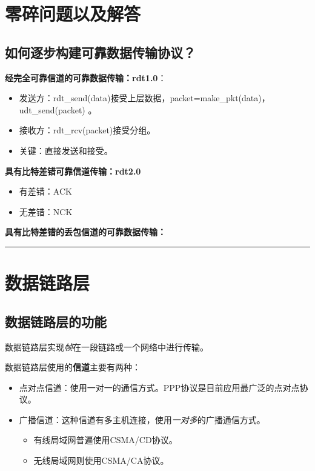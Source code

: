 \documentclass[b5paper, twoside]{article}
\let\oldtextbf\textbf
\renewcommand{\textbf}[1]{\textcolor{myblue}{\oldtextbf{#1}}}
\let\oldemph\emph
\renewcommand{\emph}[1]{{\oldemph{#1}}}
\begin{document}
\newpage

\section{零碎问题以及解答}

\subsection{如何逐步构建可靠数据传输协议？}

\textbf{经完全可靠信道的可靠数据传输：rdt1.0}：
\begin{itemize}
	\item 
	发送方：rdt\_send(data)接受上层数据，packet=make\_pkt(data)，udt\_send(packet)
	。
	\item 接收方：rdt\_rcv(packet)接受分组。
	\item 关键：直接发送和接受。
\end{itemize}

\textbf{具有比特差错可靠信道传输：rdt2.0}
\begin{itemize}
	\item 有差错：ACK
	\item 无差错：NCK
\end{itemize}

\textbf{具有比特差错的丢包信道的可靠数据传输：}

\vspace{5mm} %
\hrule height 1pt %
\vspace{5mm}

\section{数据链路层}

\subsection{数据链路层的功能}

数据链路层实现\emph{帧}在一段链路或一个网络中进行传输。

数据链路层使用的\textbf{信道}主要有两种：
\begin{itemize}
	\item 点对点信道：使用一对一的通信方式。PPP协议是目前应用最广泛的点对点协议。
	\item 广播信道：这种信道有多主机连接，使用\emph{一对多}的广播通信方式。
	\begin{itemize}
		\item 有线局域网普遍使用CSMA/CD协议。
		\item 无线局域网则使用CSMA/CA协议。
	\end{itemize}
\end{itemize}
\end{document}
